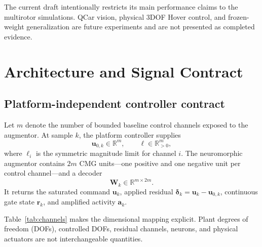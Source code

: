 \documentclass[10pt,twocolumn]{article}
\newcommand{\R}{\mathbb{R}}
\begin{document}
The current draft intentionally restricts its main performance claims to the
multirotor simulations. QCar vision, physical 3DOF Hover control, and frozen-
weight generalization are future experiments and are not presented as completed
evidence.

\section{Architecture and Signal Contract}

\subsection{Platform-independent controller contract}

Let $m$ denote the number of bounded baseline control channels exposed to the
augmentor. At sample $k$, the platform controller supplies
\begin{equation}
    \bm u_{0,k}\in\R^m, \qquad
    \bm \ell\in\R_{>0}^m,
\end{equation}
where $\ell_i$ is the symmetric magnitude limit for channel $i$. The
neuromorphic augmentor contains $2m$ CMG units---one positive and one
negative unit per control channel---and a decoder
\begin{equation}
    \bm W_k\in\R^{m\times 2m}.
\end{equation}
It returns the saturated command $\bm u_k$, applied residual
$\bm\delta_k=\bm u_k-\bm u_{0,k}$, continuous gate state $\bm r_k$, and
amplified activity $\bm a_k$.

Table~\ref{tab:channels} makes the dimensional mapping explicit. Plant degrees
of freedom (DOFs), controlled DOFs, residual channels, neurons, and physical
actuators are not interchangeable quantities.
\end{document}
